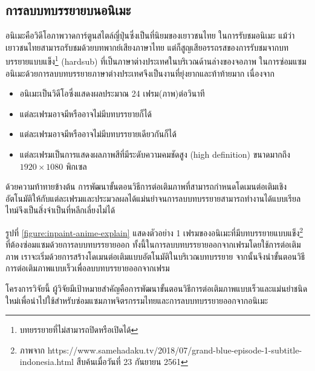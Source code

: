 

\subsection{การลบบทบรรยายบนอนิเมะ}
\hspace{1cm}อนิเมะคือวิดีโอภาพวาดการ์ตูนสไตล์ญี่ปุ่นซึ่งเป็นที่นิยมของเยาวชนไทย ในการรับชมอนิเมะ แม้ว่าเยาวชนไทยสามารถรับชมด้วยบทพากย์เสียงภาษาไทย แต่ก็สูญเสียอรรถรสของการรับชมจากบทบรรยายแบบแข็ง\footnote{บทยรรยายที่ไม่สามารถปิดหรือเปิดได้} (hardsub) ที่เป็นภาษาต่างประเทศในบริเวณด้านล่างของจอภาพ ในการซ่อมแซม\\อนิเมะด้วยการลบบทบรรยายภาษาต่างประเทศจึงเป็นงานที่ยุ่งยากและท้าท้ายมาก เนื่องจาก
\begin{itemize}
	\item [(1)] อนิเมะเป็นวิดีโอซึ่งแสดงผลประมาณ 24 เฟรม(ภาพ)ต่อวินาที
	\item [(2)] แต่ละเฟรมอาจมีหรืออาจไม่มีบทบรรยายก็ได้
	\item [(3)] แต่ละเฟรมอาจมีหรืออาจไม่มีบทบรรยายเดียวกันก็ได้
	\item [(4)] แต่ละเฟรมเป็นการแสดงผลภาพสีที่มีระดับความคมชัดสูง (high definition) ขนาดมากถึง $1920\times1080$ พิกเซล
\end{itemize}
ด้วยความท้าทายข้างต้น การพัฒนาขั้นตอนวิธีการต่อเติมภาพที่สามารถกำหนดโดเมนต่อเติมเชิงอัตโนมัติให้กับแต่ละเฟรมและประมวลผลได้แม่นยำจนการลบบทบรรยายสามารถทำงานได้แบบเรียลไทม์จึงเป็นสิ่งจำเป็นที่หลีกเลี่ยงไม่ได้
	
\hspace{1cm} รูปที่ \ref{figure:inpaint-anime-explain} แสดงตัวอย่าง 1 เฟรมของอนิเมะที่มีบทบรรยายแบบแข็ง\footnote{ภาพจาก https://www.samehadaku.tv/2018/07/grand-blue-episode-1-subtitle-indonesia.html สืบค้นเมื่อวันที่ 23 กันยายน 2561} ที่ต้องซ่อมแซมด้วยการลบบทบรรยายออก  ทั้งนี้ในการลบบทบรรยายออกจากเฟรมโดยใช้การต่อเติมภาพ เราจะเริ่มด้วยการสร้างโดเมนต่อเติมแบบอัตโนมัติในบริเวณบทบรรยาย จากนั้นจึงนำขั้นตอนวิธีการต่อเติมภาพแบบเร็วเพื่อลบบทบรรยายออกจากเฟรม 


	
\hspace{1cm} โครงการวิจัยนี้ ผู้วิจัยมีเป้าหมายสำคัญคือการพัฒนาขั้นตอนวิธีการต่อเติมภาพแบบเร็วและแม่นยำชนิดใหม่เพื่อนำไปใช้สำหรับซ่อมแซมภาพจิตรกรรมไทยและการลบบทบรรยายออกจากอนิเมะ

\clearpage
	